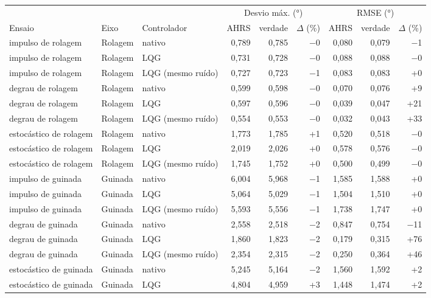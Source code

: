 \begin{tabular}{lllrrrrrr}
\toprule
 & & & \multicolumn{3}{c}{Desvio máx. (\si{\degree})} & \multicolumn{3}{c}{RMSE (\si{\degree})} \\
\cmidrule(lr){4-6}\cmidrule(lr){7-9}
Ensaio & Eixo & Controlador & AHRS & verdade & $\Delta$ (\%) & AHRS & verdade & $\Delta$ (\%) \\
\midrule
impulso de rolagem & Rolagem & nativo & 0,789 & 0,785 & $-$0 & 0,080 & 0,079 & $-$1 \\
impulso de rolagem & Rolagem & LQG & 0,731 & 0,728 & $-$0 & 0,088 & 0,088 & $-$0 \\
impulso de rolagem & Rolagem & LQG (mesmo ruído) & 0,727 & 0,723 & $-$1 & 0,083 & 0,083 & +0 \\
\addlinespace
degrau de rolagem & Rolagem & nativo & 0,599 & 0,598 & $-$0 & 0,070 & 0,076 & +9 \\
degrau de rolagem & Rolagem & LQG & 0,597 & 0,596 & $-$0 & 0,039 & 0,047 & +21 \\
degrau de rolagem & Rolagem & LQG (mesmo ruído) & 0,554 & 0,553 & $-$0 & 0,032 & 0,043 & +33 \\
\addlinespace
estocástico de rolagem & Rolagem & nativo & 1,773 & 1,785 & +1 & 0,520 & 0,518 & $-$0 \\
estocástico de rolagem & Rolagem & LQG & 2,019 & 2,026 & +0 & 0,578 & 0,576 & $-$0 \\
estocástico de rolagem & Rolagem & LQG (mesmo ruído) & 1,745 & 1,752 & +0 & 0,500 & 0,499 & $-$0 \\
\addlinespace
impulso de guinada & Guinada & nativo & 6,004 & 5,968 & $-$1 & 1,585 & 1,588 & +0 \\
impulso de guinada & Guinada & LQG & 5,064 & 5,029 & $-$1 & 1,504 & 1,510 & +0 \\
impulso de guinada & Guinada & LQG (mesmo ruído) & 5,593 & 5,556 & $-$1 & 1,738 & 1,747 & +0 \\
\addlinespace
degrau de guinada & Guinada & nativo & 2,558 & 2,518 & $-$2 & 0,847 & 0,754 & $-$11 \\
degrau de guinada & Guinada & LQG & 1,860 & 1,823 & $-$2 & 0,179 & 0,315 & +76 \\
degrau de guinada & Guinada & LQG (mesmo ruído) & 2,354 & 2,315 & $-$2 & 0,250 & 0,364 & +46 \\
\addlinespace
estocástico de guinada & Guinada & nativo & 5,245 & 5,164 & $-$2 & 1,560 & 1,592 & +2 \\
estocástico de guinada & Guinada & LQG & 4,804 & 4,959 & +3 & 1,448 & 1,474 & +2 \\

\end{tabular}
